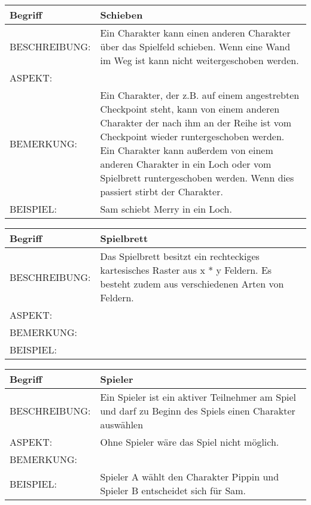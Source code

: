 \documentclass{uulm-assignment}
\begin{document}
	     \begin{tabularx}{\textwidth}{|l|X |} \hline
	        \textbf{Begriff} & \textbf{Schieben} \\
	        \hline
	        BESCHREIBUNG: &  Ein Charakter kann einen anderen Charakter über das Spielfeld schieben. Wenn eine Wand im Weg ist kann nicht weitergeschoben werden.\\
	        \hline
	        ASPEKT: &
	        \\
	        \hline
	        BEMERKUNG: &  Ein Charakter, der z.B. auf einem angestrebten
	        Checkpoint steht, kann von einem anderen Charakter der nach ihm an der Reihe ist vom Checkpoint wieder runtergeschoben werden. Ein Charakter kann außerdem von einem anderen Charakter in ein Loch oder vom Spielbrett runtergeschoben werden. Wenn dies passiert stirbt der Charakter.\\
	        \hline
	        BEISPIEL: & Sam schiebt Merry in ein Loch.\\ 
	        \hline
	    \end{tabularx}

	     \begin{tabularx}{\textwidth}{|l|X |} \hline
	        \textbf{Begriff} & \textbf{Spielbrett} \\
	        \hline
	        BESCHREIBUNG: & Das Spielbrett besitzt ein rechteckiges kartesisches Raster aus x * y Feldern. Es besteht zudem aus verschiedenen Arten von Feldern.\\
	        \hline
	        ASPEKT: &
	        \\
	        \hline
	        BEMERKUNG: &  \\
	        \hline
	        BEISPIEL: & \\
	        \hline
	    \end{tabularx}

	     \begin{tabularx}{\textwidth}{|l|X |} \hline
	        \textbf{Begriff} & \textbf{Spieler} \\
	        \hline
	        BESCHREIBUNG: & Ein Spieler ist ein aktiver Teilnehmer am Spiel und darf zu Beginn des Spiels einen Charakter auswählen  \\
	        \hline
	        ASPEKT: & Ohne Spieler wäre das Spiel nicht möglich.
	        \\
	        \hline
	        BEMERKUNG: &  \\
	        \hline
	        BEISPIEL: & Spieler A wählt den Charakter Pippin und Spieler B entscheidet sich für Sam.\\
	        \hline
	    \end{tabularx}
\end{document}
